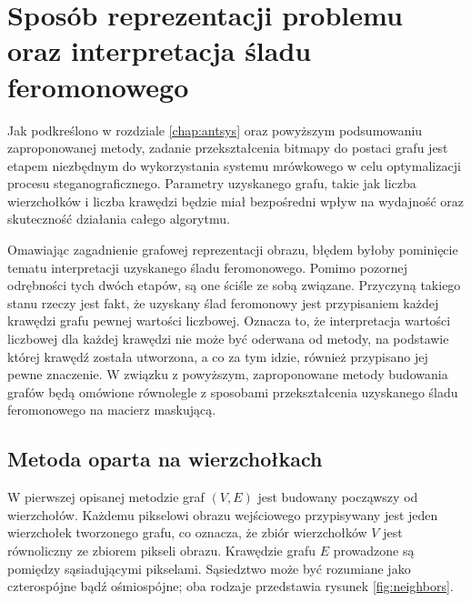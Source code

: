 {    \section{Sposób reprezentacji problemu oraz interpretacja śladu feromonowego}\label{sec:method}
    {
        Jak podkreślono w rozdziale \ref{chap:antsys} oraz powyższym podsumowaniu zaproponowanej metody, zadanie
        przekształcenia bitmapy do postaci grafu jest etapem niezbędnym do wykorzystania systemu mrówkowego w celu
        optymalizacji procesu steganograficznego. Parametry uzyskanego grafu, takie jak liczba wierzchołków i liczba
        krawędzi będzie miał bezpośredni wpływ na wydajność oraz skuteczność działania całego algorytmu.

        Omawiając zagadnienie grafowej reprezentacji obrazu, błędem byłoby pominięcie tematu interpretacji uzyskanego
        śladu feromonowego. Pomimo pozornej odrębności tych dwóch etapów, są one ściśle ze sobą związane. Przyczyną
        takiego stanu rzeczy jest fakt, że uzyskany ślad feromonowy jest przypisaniem każdej krawędzi grafu pewnej
        wartości liczbowej. Oznacza to, że interpretacja wartości liczbowej dla każdej krawędzi nie może być oderwana od
        metody, na podstawie której krawędź została utworzona, a co za tym idzie, również przypisano jej pewne
        znaczenie. W związku z powyższym, zaproponowane metody budowania grafów będą omówione równolegle z sposobami
        przekształcenia uzyskanego śladu feromonowego na macierz maskującą.

        \subsection{Metoda oparta na wierzchołkach}\label{subsec:vertex-method}
        {
            W pierwszej opisanej metodzie graf $(V, E)$ jest budowany począwszy od wierzchołów. Każdemu pikselowi obrazu
            wejściowego przypisywany jest jeden wierzchołek tworzonego grafu, co oznacza, że zbiór wierzchołków $V$ jest
            równoliczny ze zbiorem pikseli obrazu. Krawędzie grafu $E$ prowadzone są pomiędzy sąsiadującymi pikselami.
            Sąsiedztwo może być rozumiane jako czterospójne bądź ośmiospójne; oba rodzaje przedstawia rysunek
            \ref{fig:neighbors}.

            \begin{figure}
                \footnotesize
                \centering
                \hspace{8pt}


\end{figure}}}}
